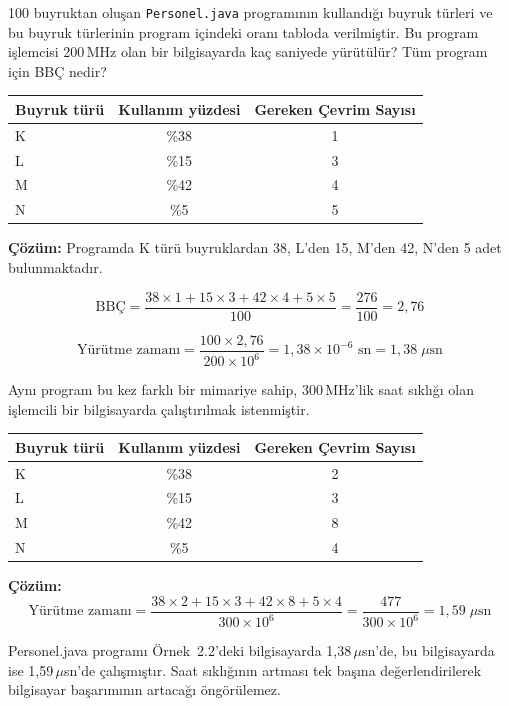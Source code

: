 \begin{ornek}[2.2]
100 buyruktan oluşan \texttt{Personel.java} programının kullandığı buyruk türleri ve bu buyruk türlerinin program içindeki oranı tabloda verilmiştir. Bu program işlemcisi 200\,MHz olan bir bilgisayarda kaç saniyede yürütülür? Tüm program için BBÇ nedir?

\begin{center}
\begin{tabular}{lcc}
\toprule
\textbf{Buyruk türü} & \textbf{Kullanım yüzdesi} & \textbf{Gereken Çevrim Sayısı} \\
\midrule
K & \%38 & 1 \\
L & \%15 & 3 \\
M & \%42 & 4 \\
N & \%5  & 5 \\
\bottomrule
\end{tabular}
\end{center}

\textbf{Çözüm:} Programda K türü buyruklardan 38, L'den 15, M'den 42, N'den 5 adet bulunmaktadır.

\[
\text{BBÇ} = \frac{38 \times 1 + 15 \times 3 + 42 \times 4 + 5 \times 5}{100} = \frac{276}{100} = 2{,}76
\]

\[
\text{Yürütme zamanı} = \frac{100 \times 2{,}76}{200 \times 10^6} = 1{,}38 \times 10^{-6} \text{ sn} = 1{,}38 \; \mu\text{sn}
\]
\end{ornek}


\begin{ornek}[2.3]
Aynı program bu kez farklı bir mimariye sahip, 300\,MHz'lik saat sıklığı olan işlemcili bir bilgisayarda çalıştırılmak istenmiştir.

\begin{center}
\begin{tabular}{lcc}
\toprule
\textbf{Buyruk türü} & \textbf{Kullanım yüzdesi} & \textbf{Gereken Çevrim Sayısı} \\
\midrule
K & \%38 & 2 \\
L & \%15 & 3 \\
M & \%42 & 8 \\
N & \%5  & 4 \\
\bottomrule
\end{tabular}
\end{center}

\textbf{Çözüm:}
\[
\text{Yürütme zamanı} = \frac{38 \times 2 + 15 \times 3 + 42 \times 8 + 5 \times 4}{300 \times 10^6} = \frac{477}{300 \times 10^6} = 1{,}59 \; \mu\text{sn}
\]

Personel.java programı Örnek~2.2'deki bilgisayarda 1,38\,$\mu$sn'de, bu bilgisayarda ise 1,59\,$\mu$sn'de çalışmıştır. Saat sıklığının artması tek başına değerlendirilerek bilgisayar başarımının artacağı öngörülemez.
\end{ornek}


